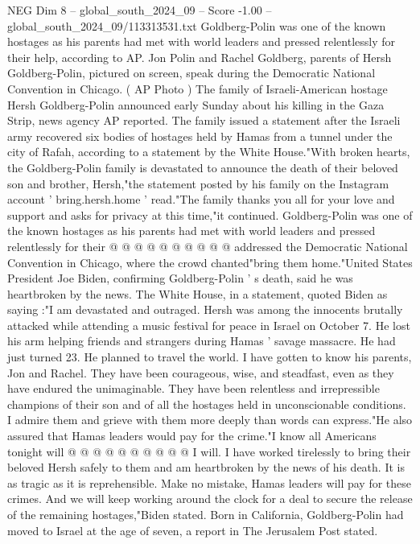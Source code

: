 \begin{textsample}{NEG Dim 8 – global\_south\_2024\_09 – Score -1.00 – global\_south\_2024\_09/113313531.txt}  \label{ex:f8_neg_160}
Goldberg-Polin was one of the known hostages as his parents had met with world leaders and pressed relentlessly for their help, according to AP.
Jon Polin and Rachel Goldberg, parents of Hersh Goldberg-Polin, pictured on screen, speak during the Democratic National Convention in Chicago. ( AP Photo ) The family of Israeli-American hostage Hersh Goldberg-Polin announced early Sunday about his killing in the Gaza Strip, news agency AP reported.
The family issued a statement after the Israeli army recovered six bodies of hostages held by Hamas from a tunnel under the city of Rafah, according to a statement by the White House."With broken hearts, the Goldberg-Polin family is devastated to announce the death of their beloved son and brother, Hersh,"the statement posted by his family on the Instagram account ' bring.hersh.home ' read."The family thanks you all for your love and support and asks for privacy at this time,"it continued.
Goldberg-Polin was one of the known hostages as his parents had met with world leaders and pressed relentlessly for their @ @ @ @ @ @ @ @ @ @ addressed the Democratic National Convention in Chicago, where the crowd chanted"bring them home."United States President Joe Biden, confirming Goldberg-Polin ' s death, said he was heartbroken by the news.
The White House, in a statement, quoted Biden as saying :"I am devastated and outraged.
Hersh was among the innocents brutally attacked while attending a music festival for peace in Israel on October 7.
He lost his arm helping friends and strangers during Hamas ' savage massacre.
He had just turned 23.
He planned to travel the world.
I have gotten to know his parents, Jon and Rachel.
They have been courageous, wise, and steadfast, even as they have endured the unimaginable.
They have been relentless and irrepressible champions of their son and of all the hostages held in unconscionable conditions.
I admire them and grieve with them more deeply than words can express."He also assured that Hamas leaders would pay for the crime."I know all Americans tonight will @ @ @ @ @ @ @ @ @ @ I will.
I have worked tirelessly to bring their beloved Hersh safely to them and am heartbroken by the news of his death.
It is as tragic as it is reprehensible.
Make no mistake, Hamas leaders will pay for these crimes.
And we will keep working around the clock for a deal to secure the release of the remaining hostages,"Biden stated.
Born in California, Goldberg-Polin had moved to Israel at the age of seven, a report in The Jerusalem Post stated.

\end{textsample}
